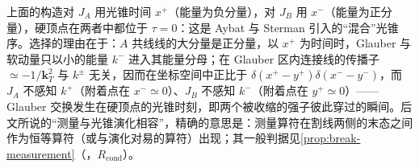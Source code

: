 \begin{remark}[每个喷注一个光锥时间]\label{rem:dy-one-time-per-jet}
上面的构造对 $J_A$ 用光锥时间 $x^+$（能量为负分量），对 $J_B$ 用 $x^-$（能量为正分量），硬顶点在两者中都位于 $\tau=0$：这是 Aybat 与 Sterman 引入的“混合”光锥序\cite{AybatSterman2009}。选择的理由在于：$A$ 共线线的大分量是正分量，以 $x^+$ 为时间时，Glauber 与软动量只以小的能量 $k^-$ 进入其能量分母；在 Glauber 区内连接线的传播子 $\simeq-1/\mathbf k_T^2$ 与 $k^\pm$ 无关，因而在坐标空间中正比于 $\delta(x^+-y^+)\delta(x^--y^-)$，而 $J_A$ 不感知 $k^+$（附着点在 $x^-\simeq0$）、$J_B$ 不感知 $k^-$（附着点在 $y^+\simeq0$）——Glauber 交换发生在硬顶点的光锥时刻，即两个被收缩的强子彼此穿过的瞬间。后文所说的“测量与光锥演化相容”，精确的意思是：测量算符在割线两侧的末态之间作为恒等算符（或与演化对易的算符）出现；其一般判据见\cref{prop:break-measurement}（\tagR，$R_{\mathrm{cond}}$）。
\end{remark}
